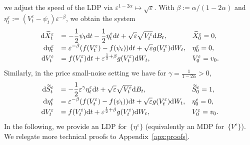 \documentclass{amsart}[11pt]
\numberwithin{equation}{section}
\numberwithin{theorem}{subsection}
\numberwithin{proposition}{subsection}
\numberwithin{definition}{subsection}
\numberwithin{lemma}{subsection}
\numberwithin{assumption}{subsection}
\newcommand{\D}{\mathrm{d}}
\newcommand{\eps}{\varepsilon}
\newcommand{\seps}{\sqrt{\eps}}
\begin{document}
we adjust the speed of the LDP via 
$\eps^{1 - 2\alpha}\mapsto \seps$.
With $\beta := \alpha / (1 - 2\alpha)$
and $\eta^\eps_t := (V_t^\eps - \psi_t)\eps^{-\beta}$, we obtain the system
\begin{equation}\label{eq:eps_MDP__eta_V}
\def\arraystretch{1.25}
\begin{array}{rll}
\D \widetilde{X}^\eps_t & = \displaystyle -\frac{1}{2}\psi_t \D t -\frac{1}{2}\eta^\eps_t \D t + \sqrt{\eps}\sqrt{V_t^\eps} \D B_t, 
& \widetilde{X}_0^\eps = 0,\\
\D \eta_{t}^\eps & = \displaystyle \eps^{-\beta}(f(V_t^\eps)-f(\psi_t))\D t + \sqrt{\eps}g(V_t^\eps)\D W_t, & \eta_{0}^\eps = 0,\\
\D V_t^\eps & = \displaystyle  f(V_t^\eps)\D t + \eps^{\frac{1}{2} + \beta}g(V_t^\eps)\D W_t, & V_0^\eps = v_0.
\end{array}
\end{equation}
Similarly, in the price small-noise setting we have for $\gamma =\frac{1}{1-2\alpha} > 0$,
\begin{equation}\label{eq:eps_price_dyn}
\def\arraystretch{1.25}
\begin{array}{rll}
\D \widetilde{S}^\eps_t & = \displaystyle -\frac{1}{2}\eps^\gamma\eta^\eps_t \D t + \sqrt{\eps}\sqrt{V_t^\eps} \D B_t,
& \widetilde{S}_0^\eps = 1,\\
\D \eta_{t}^\eps & = \displaystyle \eps^{-\beta}(f(V_t^\eps)-f(\psi_t))\D t + \sqrt{\eps}g(V_t^\eps)\D W_t, & \eta_{0}^\eps = 0,\\
\D V_t^\eps & = \displaystyle  f(V_t^\eps)\D t + \eps^{\frac{1}{2} + \beta}g(V_t^\eps)\D W_t, & V_0^\eps = v_0.
\end{array}
\end{equation}
In the following, we provide an LDP for~$\{\eta^\eps\}$ 
(equivalently an MDP for~$\{V^\eps\}$). 
We relegate more technical proofs to Appendix~\ref{apx:proofs}.

\end{document}
